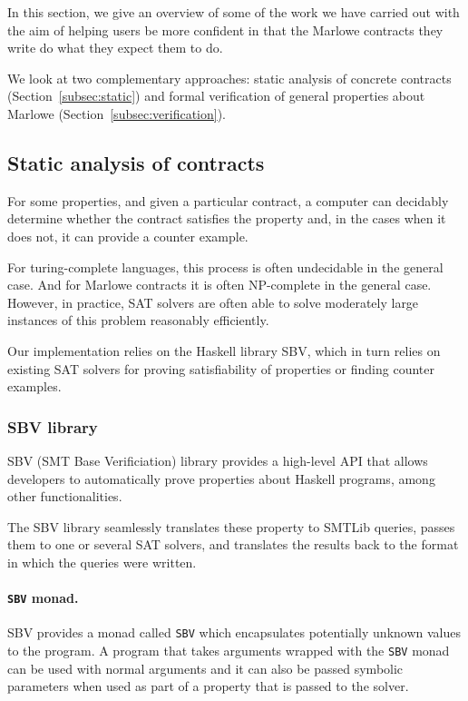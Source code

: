\documentclass[runningheads]{llncs}
\begin{document}
In this section, we give an overview of some of the work we have carried out with the aim of helping users be more confident in that the Marlowe contracts they write do what they expect them to do.

We look at two complementary approaches: static analysis of concrete contracts (Section~\ref{subsec:static}) and formal verification of general properties about Marlowe (Section~\ref{subsec:verification}).

\subsection{Static analysis of contracts\label{subsec:static}}

For some properties, and given a particular contract, a computer can decidably determine whether the contract satisfies the property and, in the cases when it does not, it can provide a counter example.

For turing-complete languages, this process is often undecidable in the general case. And for Marlowe contracts it is often NP-complete in the general case. However, in practice, SAT solvers are often able to solve moderately large instances of this problem reasonably efficiently.

Our implementation relies on the Haskell library SBV, which in turn relies on existing SAT solvers for proving satisfiability of properties or finding counter examples.

\subsubsection{SBV library}

SBV (SMT Base Verificiation) library provides a high-level API that allows developers to automatically prove properties about Haskell programs, among other functionalities.

The SBV library seamlessly translates these property to SMTLib queries, passes them to one or several SAT solvers, and translates the results back to the format in which the queries were written.

\paragraph{\texttt{SBV} monad.}

SBV provides a monad called \texttt{SBV} which encapsulates potentially unknown values to the program. A program that takes arguments wrapped with the \texttt{SBV} monad can be used with normal arguments and it can also be passed symbolic parameters when used as part of a property that is passed to the solver.
\end{document}
